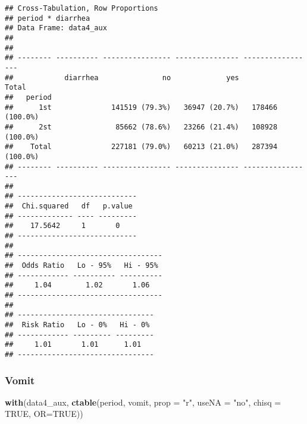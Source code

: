 \documentclass[
]{article}
\newenvironment{Shaded}{\begin{snugshade}}{\end{snugshade}}
\newcommand{\DataTypeTok}[1]{\textcolor[rgb]{0.13,0.29,0.53}{#1}}
\newcommand{\KeywordTok}[1]{\textcolor[rgb]{0.13,0.29,0.53}{\textbf{#1}}}
\newcommand{\NormalTok}[1]{#1}
\newcommand{\OtherTok}[1]{\textcolor[rgb]{0.56,0.35,0.01}{#1}}
\newcommand{\StringTok}[1]{\textcolor[rgb]{0.31,0.60,0.02}{#1}}
\begin{document}
\begin{verbatim}
## Cross-Tabulation, Row Proportions  
## period * diarrhea  
## Data Frame: data4_aux  
## 
## 
## -------- ---------- ---------------- --------------- -----------------
##            diarrhea               no             yes             Total
##   period                                                              
##      1st              141519 (79.3%)   36947 (20.7%)   178466 (100.0%)
##      2st               85662 (78.6%)   23266 (21.4%)   108928 (100.0%)
##    Total              227181 (79.0%)   60213 (21.0%)   287394 (100.0%)
## -------- ---------- ---------------- --------------- -----------------
## 
## ----------------------------
##  Chi.squared   df   p.value 
## ------------- ---- ---------
##    17.5642     1       0    
## ----------------------------
## 
## ----------------------------------
##  Odds Ratio   Lo - 95%   Hi - 95% 
## ------------ ---------- ----------
##     1.04        1.02       1.06   
## ----------------------------------
## 
## --------------------------------
##  Risk Ratio   Lo - 0%   Hi - 0% 
## ------------ --------- ---------
##     1.01       1.01      1.01   
## --------------------------------
\end{verbatim}

\hypertarget{vomit}{%
\subsubsection{Vomit}\label{vomit}}

\begin{Shaded}
\begin{Highlighting}[]
\KeywordTok{with}\NormalTok{(data4_aux, }\KeywordTok{ctable}\NormalTok{(period, vomit, }\DataTypeTok{prop =} \StringTok{"r"}\NormalTok{, }\DataTypeTok{useNA =} \StringTok{"no"}\NormalTok{, }\DataTypeTok{chisq =} \OtherTok{TRUE}\NormalTok{, }\DataTypeTok{OR=}\OtherTok{TRUE}\NormalTok{))}
\end{Highlighting}
\end{Shaded}
\end{document}
